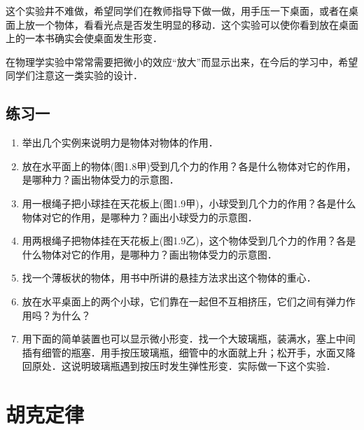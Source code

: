 这个实验井不难做，希望同学们在教师指导下做一做，用手压一下桌面，或者在桌面上放一个物体，看看光点是否发生明显的移动．这个实验可以使你看到放在桌面上的一本书确实会使桌面发生形变．

在物理学实验中常常需要把微小的效应“放大”而显示出来，在今后的学习中，希望同学们注意这一类实验的设计．

\subsection*{练习一}

\begin{enumerate}
    \item  举出几个实例来说明力是物体对物体的作用．
    \item 放在水平面上的物体(图1.8甲)受到几个力的作用？各是什么物体对它的作用，是哪种力？画出物体受力的示意图．
    \item 用一根绳子把小球挂在天花板上(图1.9甲)，小球受到几个力的作用？各是什么物体对它的作用，是哪种力？画出小球受力的示意图．
    \item 用两根绳子把物体挂在天花板上(图1.9乙)，这个物体受到几个力的作用？各是什么物体对它的作用，是哪种力？画出物体受力的示意图．
    \item 找一个薄板状的物体，用书中所讲的悬挂方法求出这个物体的重心．
    \item 放在水平桌面上的两个小球，它们靠在一起但不互相挤压，它们之间有弹力作用吗？为什么？
    \item 用下面的简单装置也可以显示微小形变．找一个大玻璃瓶，装满水，塞上中间插有细管的瓶塞．用手按压玻璃瓶，细管中的水面就上升；松开手，水面又降回原处．这说明玻璃瓶遇到按压时发生弹性形变．实际做一下这个实验．
\end{enumerate}

\newpage

\section{胡克定律}

